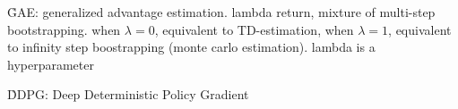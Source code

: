 \r{GAE: generalized advantage estimation. lambda return, mixture of multi-step bootstrapping. when $\lambda = 0$, equivalent to TD-estimation, when $\lambda = 1$, equivalent to infinity step boostrapping (monte carlo estimation). lambda is a hyperparameter}


\r{DDPG: Deep Deterministic Policy Gradient}

